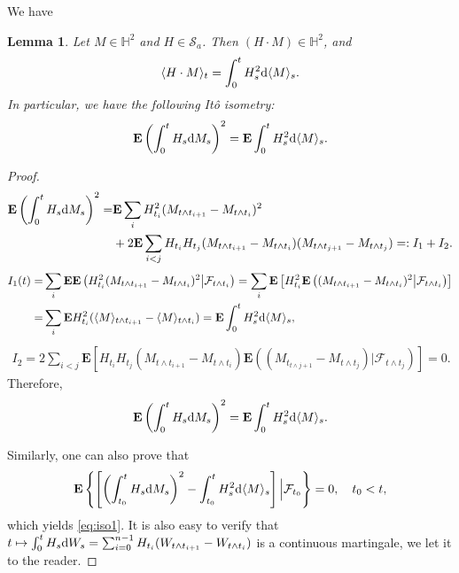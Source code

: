 \documentclass[twoside, 12pt]{book}
\numberwithin{equation}{chapter}
\newtheorem{lemma}[theorem]{Lemma}
\def\cF{{\mathcal F}}
\def\cS{{\mathcal S}}
\def\mH{{\mathbb H}}
\def\bE{{\mathbf E}}
\def\l{\left}
\def\r{\right}
\def\<{\langle}
\def\>{\rangle}
\def\d{\text{\rm{d}}}
\begin{document}
   We have 
	\begin{lemma}\label{lem:iso}
		Let $M\in \mH^2$ and $H\in \cS_a$. Then $(H\cdot M)\in \mH^2$, and 
		\begin{equation}\label{eq:iso1}
			\<H\cdot M\>_t= \int_0^t H_s^2 \d \<M\>_s. 
		\end{equation}
		In particular, we have the following It\^o isometry:  
		\begin{equation}
			\bE \l(\int_0^t H_s \d M_s \r)^2 = \bE \int_0^t H_s^2 \d \<M\>_s. 
		\end{equation}
	\end{lemma}
	\begin{proof}
		\begin{align*}
			\bE \l(\int_0^t H_s \d M_s\r)^2=& \bE \sum_{i} H_{t_i}^2 (M_{t\wedge t_{i+1}}-M_{t\wedge t_i})^2\\
			 &+ 2\bE \sum_{i<j} H_{t_i}H_{t_j}(M_{t\wedge t_{i+1}}-M_{t\wedge t_i})(M_{t\wedge t_{j+1}}-M_{t\wedge t_j}) =: I_1+ I_2. 
		\end{align*}
		\begin{align*}
			\begin{aligned}
				I_1(t)=&\sum_{i} \bE \bE \l(H_{t_i}^2 (M_{t\wedge t_{i+1}}-M_{t\wedge t_i})^2\big|\cF_{t\wedge t_i}\r)= \sum_{i} \bE \l[ H_{t_i}^2 \bE\l( (M_{t\wedge t_{i+1}}-M_{t\wedge t_i})^2\big|\cF_{t\wedge t_i}\r) \r] \\
				=&\sum_{i}  \bE H_{t_i}^2 (\<M\>_{t\wedge t_{i+1}}-\<M\>_{t\wedge t_{i}})= \bE  \int_0^t H^2_s \d \<M\>_s ,
			\end{aligned}
		\end{align*}
		\begin{align*}
			I_2= 2\sum_{i<j} \bE \l[  H_{t_i}H_{t_j}(M_{t\wedge t_{i+1}}-M_{t\wedge t_i}) \bE \l( (M_{t_{t\wedge j+1}}-M_{t\wedge t_j}) \big|\cF_{t\wedge t_j}\r) \r]=0. 
		\end{align*}
		Therefore, 
		\begin{equation*}
			\bE \l(\int_0^t H_s \d M_s\r)^2=  \bE  \int_0^t H^2_s \d \<M\>_s. 
		\end{equation*}
		
		Similarly, one can also prove that 
		\[
		    \bE\l\{ \l[ \l(\int_{t_0}^t H_s \d M_s\r)^2-\int_{t_0}^t H^2_s \d \<M\>_s  \r] \Big| \cF_{t_0}\r\}=0, \quad t_0<t, 
		\]
		which yields \eqref{eq:iso1}. It is also easy to verify that $t\mapsto \int_0^t H_s \d W_s=  \sum_{i=0}^{n-1} H_{t_i}(W_{t\wedge t_{i+1}}-W_{t\wedge t_i})$ is a continuous martingale, we let it to the reader. 
	\end{proof}
	
\end{document}
